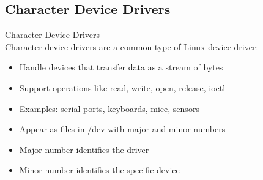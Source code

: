 \subsection{Character Device Drivers}

\begin{definition}{Character Device Drivers}\\
    Character device drivers are a common type of Linux device driver:
    \begin{itemize}
        \item Handle devices that transfer data as a stream of bytes
        \item Support operations like read, write, open, release, ioctl
        \item Examples: serial ports, keyboards, mice, sensors
        \item Appear as files in /dev with major and minor numbers
        \item Major number identifies the driver
        \item Minor number identifies the specific device
    \end{itemize}
\end{definition}

